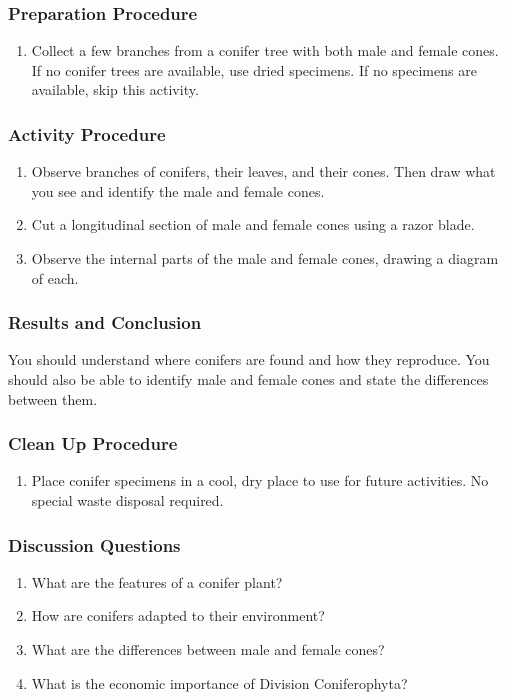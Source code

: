 \subsubsection*{Preparation Procedure}
\begin{enumerate}
\item{Collect a few branches from a conifer tree with both male and female cones. If no conifer trees are available, use dried specimens. If no specimens are available, skip this activity.}
\end{enumerate}

\subsubsection*{Activity Procedure}
\begin{enumerate}
\item{Observe branches of conifers, their leaves, and their cones. Then draw what you see and identify the male and female cones.}
\item{Cut a longitudinal section of male and female cones using a razor blade.}
\item{Observe the internal parts of the male and female cones, drawing a diagram of each.}
\end{enumerate}

\subsubsection*{Results and Conclusion}
You should understand where conifers are found and how they reproduce. You should also be able to identify male and female cones and state the differences between them.

\subsubsection*{Clean Up Procedure}
\begin{enumerate}
\item{Place conifer specimens in a cool, dry place to use for future activities. No special waste disposal required.}
\end{enumerate}

\subsubsection*{Discussion Questions}
\begin{enumerate}
\item{What are the features of a conifer plant?}
\item{How are conifers adapted to their environment?}
\item{What are the differences between male and female cones?}
\item{What is the economic importance of Division Coniferophyta?}
\end{enumerate}

